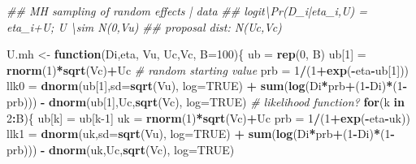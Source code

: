 \documentclass[]{book}
\newenvironment{Shaded}{\begin{snugshade}}{\end{snugshade}}
\newcommand{\CommentTok}[1]{\textcolor[rgb]{0.56,0.35,0.01}{\textit{#1}}}
\newcommand{\ControlFlowTok}[1]{\textcolor[rgb]{0.13,0.29,0.53}{\textbf{#1}}}
\newcommand{\DataTypeTok}[1]{\textcolor[rgb]{0.13,0.29,0.53}{#1}}
\newcommand{\DecValTok}[1]{\textcolor[rgb]{0.00,0.00,0.81}{#1}}
\newcommand{\KeywordTok}[1]{\textcolor[rgb]{0.13,0.29,0.53}{\textbf{#1}}}
\newcommand{\NormalTok}[1]{#1}
\newcommand{\OperatorTok}[1]{\textcolor[rgb]{0.81,0.36,0.00}{\textbf{#1}}}
\newcommand{\OtherTok}[1]{\textcolor[rgb]{0.56,0.35,0.01}{#1}}
\newcommand{\StringTok}[1]{\textcolor[rgb]{0.31,0.60,0.02}{#1}}
\begin{document}
\begin{Shaded}
\begin{Highlighting}[]
\CommentTok{## MH sampling of random effects | data}
\CommentTok{## logit\textbackslash{}Pr(D_i|eta_i,U) = eta_i+U; U \textbackslash{}sim N(0,Vu)}
\CommentTok{## proposal dist: N(Uc,Vc)}

\NormalTok{U.mh <-}\StringTok{ }\ControlFlowTok{function}\NormalTok{(Di,eta, Vu, Uc,Vc, }\DataTypeTok{B=}\DecValTok{100}\NormalTok{)\{}
\NormalTok{  ub =}\StringTok{ }\KeywordTok{rep}\NormalTok{(}\DecValTok{0}\NormalTok{, B)}
\NormalTok{  ub[}\DecValTok{1}\NormalTok{] =}\StringTok{ }\KeywordTok{rnorm}\NormalTok{(}\DecValTok{1}\NormalTok{)}\OperatorTok{*}\KeywordTok{sqrt}\NormalTok{(Vc)}\OperatorTok{+}\NormalTok{Uc }\CommentTok{# random starting value}
\NormalTok{  prb =}\StringTok{ }\DecValTok{1}\OperatorTok{/}\NormalTok{(}\DecValTok{1}\OperatorTok{+}\KeywordTok{exp}\NormalTok{(}\OperatorTok{-}\NormalTok{eta}\OperatorTok{-}\NormalTok{ub[}\DecValTok{1}\NormalTok{]))}
\NormalTok{  llk0 =}\StringTok{ }\KeywordTok{dnorm}\NormalTok{(ub[}\DecValTok{1}\NormalTok{],}\DataTypeTok{sd=}\KeywordTok{sqrt}\NormalTok{(Vu), }\DataTypeTok{log=}\OtherTok{TRUE}\NormalTok{) }\OperatorTok{+}\StringTok{ }\KeywordTok{sum}\NormalTok{(}\KeywordTok{log}\NormalTok{(Di}\OperatorTok{*}\NormalTok{prb}\OperatorTok{+}\NormalTok{(}\DecValTok{1}\OperatorTok{-}\NormalTok{Di)}\OperatorTok{*}\NormalTok{(}\DecValTok{1}\OperatorTok{-}\NormalTok{prb))) }\OperatorTok{-}\StringTok{ }\KeywordTok{dnorm}\NormalTok{(ub[}\DecValTok{1}\NormalTok{],Uc,}\KeywordTok{sqrt}\NormalTok{(Vc), }\DataTypeTok{log=}\OtherTok{TRUE}\NormalTok{) }\CommentTok{# likelihood function? }
  \ControlFlowTok{for}\NormalTok{(k }\ControlFlowTok{in} \DecValTok{2}\OperatorTok{:}\NormalTok{B)\{}
\NormalTok{    ub[k] =}\StringTok{ }\NormalTok{ub[k}\DecValTok{-1}\NormalTok{]}
\NormalTok{    uk =}\StringTok{ }\KeywordTok{rnorm}\NormalTok{(}\DecValTok{1}\NormalTok{)}\OperatorTok{*}\KeywordTok{sqrt}\NormalTok{(Vc)}\OperatorTok{+}\NormalTok{Uc}
\NormalTok{    prb =}\StringTok{ }\DecValTok{1}\OperatorTok{/}\NormalTok{(}\DecValTok{1}\OperatorTok{+}\KeywordTok{exp}\NormalTok{(}\OperatorTok{-}\NormalTok{eta}\OperatorTok{-}\NormalTok{uk))}
\NormalTok{    llk1 =}\StringTok{ }\KeywordTok{dnorm}\NormalTok{(uk,}\DataTypeTok{sd=}\KeywordTok{sqrt}\NormalTok{(Vu), }\DataTypeTok{log=}\OtherTok{TRUE}\NormalTok{) }\OperatorTok{+}\StringTok{ }\KeywordTok{sum}\NormalTok{(}\KeywordTok{log}\NormalTok{(Di}\OperatorTok{*}\NormalTok{prb}\OperatorTok{+}\NormalTok{(}\DecValTok{1}\OperatorTok{-}\NormalTok{Di)}\OperatorTok{*}\NormalTok{(}\DecValTok{1}\OperatorTok{-}\NormalTok{prb))) }\OperatorTok{-}\StringTok{ }\KeywordTok{dnorm}\NormalTok{(uk,Uc,}\KeywordTok{sqrt}\NormalTok{(Vc), }\DataTypeTok{log=}\OtherTok{TRUE}\NormalTok{)}

\end{Highlighting}
\end{Shaded}
\end{document}
